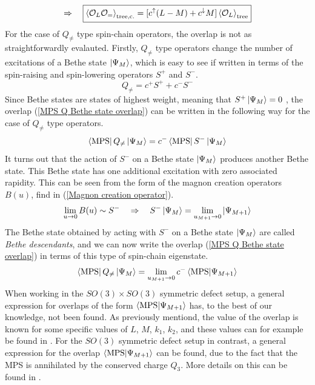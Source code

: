 %
%
\begin{equation}
\Rightarrow \quad
%
\boxed{
\expval{\mathcal{O}_L \mathcal{O}_{=}}_{\text{tree,c.}}
=
[c^{\uparrow} (L-M) + c^{\downarrow} M] \expval{\mathcal{O}_L}_{\text{tree}}
}
\end{equation}
%
%
For the case of $Q_{\neq}$ type spin-chain operators, the overlap is not as straightforwardly evalauted. Firstly, $Q_{\neq}$ type operators change the number of excitations of a Bethe state $\ket{\Psi_M}$, which is easy to see if written in terms of the spin-raising and spin-lowering operators $S^{+}$ and $S^{-}$.
%
%
\begin{equation}
Q_{\neq} = c^{+} S^{+} + c^{-} S^{-}
\end{equation}
%
%
Since Bethe states are states of highest weight, meaning that $S^{+} \ket{\Psi_M} = 0$ \cite{Algebraic Bethe Ansatz}, the overlap (\ref{MPS Q Bethe state overlap}) can be written in the following way for the case of $Q_{\neq}$ type operators.
%
%
\begin{equation}
\bra{\text{MPS}} Q_{\neq} \ket{\Psi_M} = c^{-} \bra{\text{MPS}} S^{-} \ket{\Psi_M}
\end{equation}
%
%
It turns out that the action of $S^{-}$ on a Bethe state $\ket{\Psi_M}$ produces another Bethe state. This Bethe state has one additional excitation with zero associated rapidity. This can be seen from the form of the magnon creation operators $B(u)$, find in (\ref{Magnon creation operator}).
%
%
\begin{equation}
\lim_{u \to 0} B(u) \sim S^{-}
%
\quad \Rightarrow \quad
%
S^{-} \ket{\Psi_M} = \lim_{u_{M+1} \to 0} \ket{\Psi_{M+1}}
\end{equation}
%
%
The Bethe state obtained by acting with $S^{-}$ on a Bethe state $\ket{\Psi_M}$ are called \textit{Bethe descendants}, and we can now write the overlap (\ref{MPS Q Bethe state overlap}) in terms of this type of spin-chain eigenstate.
%
%
\begin{equation}
\bra{\text{MPS}} Q_{\neq} \ket{\Psi_M}
=
\lim_{u_{M+1} \to 0} c^{-} \braket{\text{MPS}}{\Psi_{M+1}}
\end{equation}
%
%
When working in the $SO(3) \times SO(3)$ symmetric defect setup, a general expression for overlaps of the form $\braket{\text{MPS}}{\Psi_{M+1}}$ has, to the best of our knowledge, not been found. As previously mentiond, the value of the overlap is known for some specific values of $L$, $M$, $k_1$, $k_2$, and these values can for example be found in \cite{Lack of integrability in SO(3)xSO(3)}. For the $SO(3)$ symmetric defect setup in contrast, a general expression for the overlap $\braket{\text{MPS}}{\Psi_{M+1}}$ can be found, due to the fact that the MPS is annihilated by the conserved charge $Q_3$. More details on this can be found in \cite{Length L length 2 two-point functions D5-D3}. 


